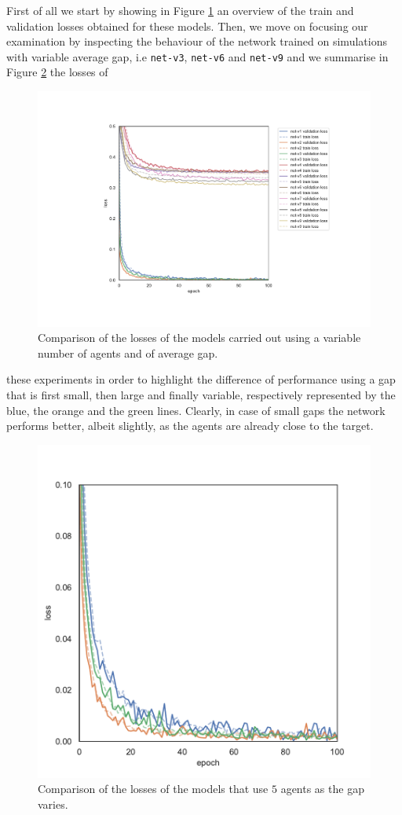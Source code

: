 First of all we start by showing in Figure \ref{fig:t2lossallt} an overview of the train 
and validation losses obtained for these models.
Then, we move on focusing our examination by inspecting the behaviour of the 
network trained on simulations with variable average gap, i.e \texttt{net-v3}, 
\texttt{net-v6} and \texttt{net-v9} and we summarise in Figure 
\ref{fig:commlossn5t2} the losses of 
\begin{figure}[!htb]
	\centering
	\includegraphics[width=.7\textwidth]{contents/images/task2/loss-communication-all@}%
	\caption[Comparison of losses of the second set of experiments.]{Comparison 
		of the losses of the models carried out using a variable number of agents and 
		of average gap.}
	\label{fig:t2lossallt}
\end{figure}

\noindent
these experiments in order to highlight the 
difference of performance using a gap that is first small, then large and finally 
variable, respectively represented by the blue, the orange and the green lines.
Clearly, in case of small gaps the network performs better, albeit slightly, as the 
agents are already close to the target.

\begin{figure}[!htb]
	\centering
	\includegraphics[width=.45\textwidth]{contents/images/task2/loss-communication-N5}
	\caption{Comparison of the losses of the models that use $5$ agents as the gap 
		varies.}
	\label{fig:commlossn5t2}
\end{figure}
	
